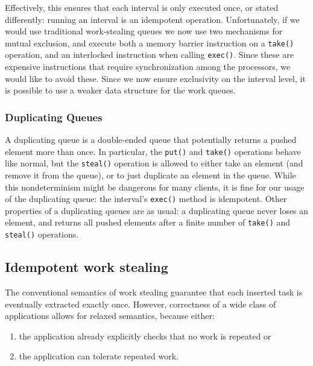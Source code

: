 

Effectively, this ensures that each interval is only executed once, or
stated differently: running an interval is an idempotent
operation. Unfortunately, if we would use traditional work-stealing
queues we now use two mechanisms for mutual exclusion, and execute
both a memory barrier instruction on a \lstinline!take()! operation,
and an interlocked instruction when calling \lstinline!exec()!. Since
these are expensive instructions that require synchronization among
the processors, we would like to avoid these. Since we now ensure
exclusivity on the interval level, it is possible to use a weaker data
structure for the work queues.

\subsubsection{Duplicating Queues}

A duplicating queue is a double-ended queue that potentially returns a
pushed element more than once. In particular, the \lstinline!put()!
and \lstinline!take()! operations behave like normal, but the
\lstinline!steal()! operation is allowed to either take an element
(and remove it from the queue), or to just duplicate an element in the
queue. While this nondeterminism might be dangerous for many clients,
it is fine for our usage of the duplicating queue: the interval's
\lstinline!exec()! method is idempotent. Other properties of a
duplicating queues are as usual: a duplicating queue never loses an
element, and returns all pushed elements after a finite number of
\lstinline!take()! and \lstinline!steal()! operations.

\subsection{Idempotent work stealing \cite{Michael2009}}

The conventional semantics of work stealing guarantee that each
inserted task is eventually extracted exactly once. However,
correctness of a wide class of applications allows for relaxed
semantics, because either:

\begin{enumerate}
\item the application already explicitly checks that no work is
  repeated or
\item the application can tolerate repeated work.
\end{enumerate}

